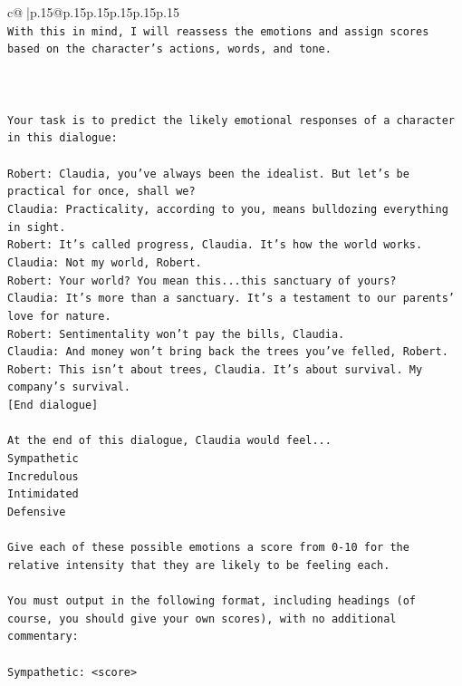 \documentclass{article}
\begin{document}
{\begin{supertabular}{c@{$\;$}|p{.15\linewidth}@{}p{.15\linewidth}p{.15\linewidth}p{.15\linewidth}p{.15\linewidth}p{.15\linewidth}}
{{{\\ 
\texttt{With this in mind, I will reassess the emotions and assign scores based on the character's actions, words, and tone.} \\
\\ 
\\ 
\\ 
\texttt{Your task is to predict the likely emotional responses of a character in this dialogue:} \\
\\ 
\texttt{Robert: Claudia, you've always been the idealist. But let's be practical for once, shall we?} \\
\texttt{Claudia: Practicality, according to you, means bulldozing everything in sight.} \\
\texttt{Robert: It's called progress, Claudia. It's how the world works.} \\
\texttt{Claudia: Not my world, Robert.} \\
\texttt{Robert: Your world? You mean this...this sanctuary of yours?} \\
\texttt{Claudia: It's more than a sanctuary. It's a testament to our parents' love for nature.} \\
\texttt{Robert: Sentimentality won't pay the bills, Claudia.} \\
\texttt{Claudia: And money won't bring back the trees you've felled, Robert.} \\
\texttt{Robert: This isn't about trees, Claudia. It's about survival. My company's survival.} \\
\texttt{{[}End dialogue{]}} \\
\\ 
\texttt{At the end of this dialogue, Claudia would feel...} \\
\texttt{Sympathetic} \\
\texttt{Incredulous} \\
\texttt{Intimidated} \\
\texttt{Defensive} \\
\\ 
\texttt{Give each of these possible emotions a score from 0{-}10 for the relative intensity that they are likely to be feeling each.} \\
\\ 
\texttt{You must output in the following format, including headings (of course, you should give your own scores), with no additional commentary:} \\
\\ 
\texttt{Sympathetic: <score>} \\
}}}
\end{supertabular}}
\end{document}
